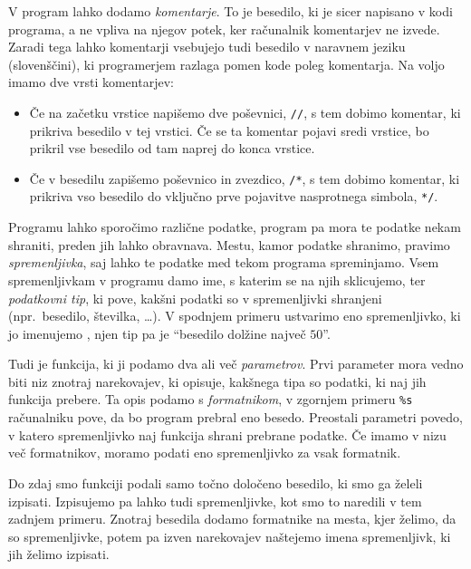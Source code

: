 V program lahko dodamo \emph{komentarje}.
To je besedilo, ki je sicer napisano v kodi programa, a ne vpliva na njegov
potek, ker računalnik komentarjev ne izvede.
Zaradi tega lahko komentarji vsebujejo tudi besedilo v naravnem jeziku
(slovenščini), ki programerjem razlaga pomen kode poleg komentarja.
Na voljo imamo dve vrsti komentarjev:
\begin{itemize}
\item Če na začetku vrstice napišemo dve poševnici, \verb+//+, s tem dobimo
  komentar, ki prikriva besedilo v tej vrstici.
  Če se ta komentar pojavi sredi vrstice, bo prikril vse besedilo od tam naprej
  do konca vrstice.
\item Če v besedilu zapišemo poševnico in zvezdico, \verb+/*+, s tem dobimo
  komentar, ki prikriva vso besedilo do vključno prve pojavitve nasprotnega
  simbola, \verb+*/+.
\end{itemize}



Programu lahko sporočimo različne podatke, program pa mora te podatke nekam
shraniti, preden jih lahko obravnava.
Mestu, kamor podatke shranimo, pravimo \emph{spremenljivka}, saj lahko te
podatke med tekom programa spreminjamo.
Vsem spremenljivkam v programu damo ime, s katerim se na njih sklicujemo, ter
\emph{podatkovni tip}, ki pove, kakšni podatki so v spremenljivki shranjeni
(npr.~besedilo, številka, \ldots).
V spodnjem primeru ustvarimo eno spremenljivko, ki jo imenujemo
, njen tip pa je \enquote{besedilo dolžine največ $50$}.


Tudi  je funkcija, ki ji podamo dva ali več \emph{parametrov}.
Prvi parameter mora vedno biti niz znotraj narekovajev, ki opisuje, kakšnega
tipa so podatki, ki naj jih funkcija prebere.
Ta opis podamo s \emph{formatnikom}, v zgornjem primeru \verb+%s+ računalniku
pove, da bo program prebral eno besedo.
Preostali parametri povedo, v katero spremenljivko naj funkcija shrani prebrane
podatke.
Če imamo v nizu več formatnikov, moramo podati eno spremenljivko za vsak
formatnik.

Do zdaj smo funkciji  podali samo točno določeno besedilo, ki smo
ga želeli izpisati.
Izpisujemo pa lahko tudi spremenljivke, kot smo to naredili v tem zadnjem
primeru.
Znotraj besedila dodamo formatnike na mesta, kjer želimo, da so spremenljivke,
potem pa izven narekovajev naštejemo imena spremenljivk, ki jih želimo izpisati.

